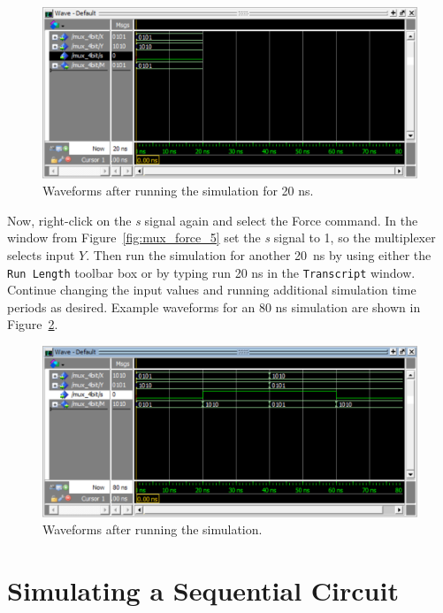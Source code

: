 \documentclass[11pt, twoside, pdftex]{article}
\begin{document}
\begin{figure}[H]
   \begin{center}
      \includegraphics[scale=.75]{figures/mux_20ns.png}
       \caption{Waveforms after running the simulation for 20 ns.} 
	 \label{fig:mux_20ns}
	 \end{center}
\end{figure}

Now, right-click on the {\it s} signal again and select the {\sf Force} command. In the window 
from Figure~\ref{fig:mux_force_5} set the {\it s} signal to 1, so the multiplexer selects input $Y$.
Then run the simulation for another 20~ns by using either the \texttt{Run Length} toolbar box
or by typing {\sf run 20 ns} in the \texttt{Transcript} window. Continue changing the
input values and running additional simulation time periods as desired. Example waveforms for
an 80 ns simulation are shown in Figure~\ref{fig:mux_80ns}.

\begin{figure}[H]
   \begin{center}
      \includegraphics[scale=.75]{figures/mux_80ns.png}
       \caption{Waveforms after running the simulation.} 
	 \label{fig:mux_80ns}
	 \end{center}
\end{figure}

\section{Simulating a Sequential Circuit}
\end{document}
